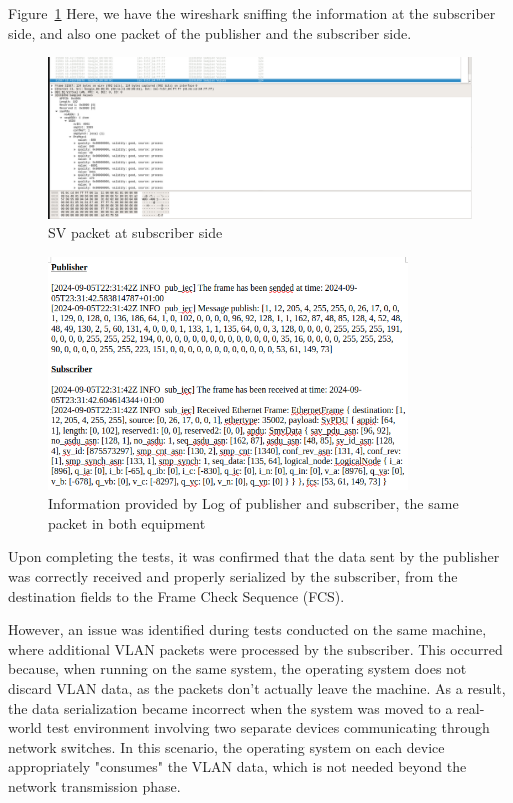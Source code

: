 Figure~\ref{fig:subscriber_side} Here, we have the wireshark sniffing the information at the subscriber side, and also one packet of the publisher and the subscriber side.

\begin{figure}[tbh]
	\centering
	\includegraphics[width=1.00\textwidth, keepaspectratio]{ch6/assets/subscriber_side.png} %
	\caption{SV packet at subscriber side}
	\label{fig:subscriber_side}
\end{figure}
\FloatBarrier

\begin{figure}[tbh]
	\centering
	\includegraphics[width=0.85\textwidth, keepaspectratio]{ch6/assets/information_packet_sub_pub.png} %
	\caption{Information provided by Log of publisher and subscriber, the same packet in both equipment}
	\label{fig:information_packet_sub_pub}
\end{figure}
\FloatBarrier

Upon completing the tests, it was confirmed that the data sent by the publisher was correctly received and properly serialized by the subscriber, from the destination fields to the Frame Check Sequence (FCS).

However, an issue was identified during tests conducted on the same machine, where additional VLAN packets were processed by the subscriber. This occurred because, when running on the same system, the operating system does not discard VLAN data, as the packets don’t actually leave the machine. As a result, the data serialization became incorrect when the system was moved to a real-world test environment involving two separate devices communicating through network switches. In this scenario, the operating system on each device appropriately "consumes" the VLAN data, which is not needed beyond the network transmission phase.

